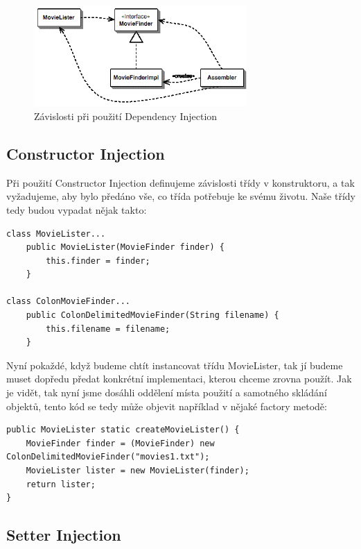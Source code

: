 \documentclass[a4paper,conference]{IEEEtran}
\begin{document}
\begin{figure}[!ht]
\centering
\includegraphics[width=3.2in]{2-Injector}
\caption{Závislosti při použití Dependency Injection}
\label{fig:injector}
\end{figure}

\subsection{Constructor Injection}

Při použití Constructor Injection definujeme závislosti třídy v konstruktoru, a tak vyžadujeme, aby bylo předáno vše, co třída potřebuje ke svému životu. Naše třídy tedy budou vypadat nějak takto:

\lstset{language=Java, caption=MovieLister s použitím Constructor Injection, label=listing:Java}
\begin{lstlisting}
class MovieLister...
    public MovieLister(MovieFinder finder) {
        this.finder = finder;       
    }

class ColonMovieFinder...
    public ColonDelimitedMovieFinder(String filename) {
        this.filename = filename;
    }
\end{lstlisting}

Nyní pokaždé, když budeme chtít instancovat třídu MovieLister, tak jí budeme muset dopředu předat konkrétní implementaci, kterou chceme zrovna použít. Jak je vidět, tak nyní jsme dosáhli oddělení místa použití a samotného skládání objektů, tento kód se tedy může objevit například v nějaké factory metodě:

\lstset{language=Java, caption=Příklad použití ve factory metodě, label=listing:Java}
\begin{lstlisting}
public MovieLister static createMovieLister() {
    MovieFinder finder = (MovieFinder) new ColonDelimitedMovieFinder("movies1.txt");
    MovieLister lister = new MovieLister(finder);
    return lister;
}
\end{lstlisting}

\subsection{Setter Injection}
\end{document}
